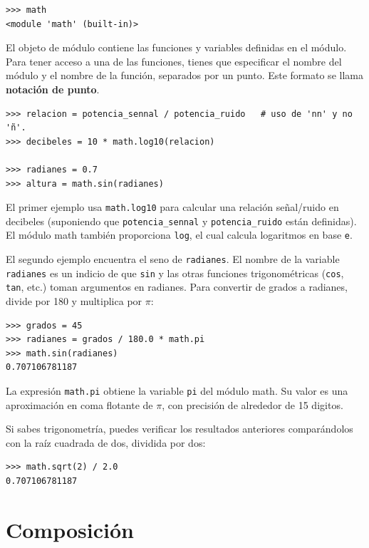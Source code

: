 \documentclass[10pt]{book}
\begin{document}
\begin{verbatim}
>>> math
<module 'math' (built-in)>
\end{verbatim}
%
El objeto de módulo contiene las funciones y variables definidas en el
módulo. Para tener acceso a una de las funciones, tienes que especificar el nombre
del módulo y el nombre de la función, separados por un punto.
Este formato se llama {\bf notación de punto}.

\begin{verbatim}
>>> relacion = potencia_sennal / potencia_ruido   # uso de 'nn' y no 'ñ'.
>>> decibeles = 10 * math.log10(relacion)

>>> radianes = 0.7
>>> altura = math.sin(radianes)
\end{verbatim}
%
El primer ejemplo usa \verb"math.log10" para calcular
una relación señal/ruido en decibeles (suponiendo que \verb"potencia_sennal" y
\verb"potencia_ruido" están definidas).  El módulo math también proporciona {\tt log},
el cual calcula logaritmos en base {\tt e}.

El segundo ejemplo encuentra el seno de {\tt radianes}.  El nombre de la variable {\tt radianes} es un indicio de que {\tt sin} y las otras funciones
trigonométricas ({\tt cos}, {\tt tan}, etc.)  toman argumentos en radianes. Para
convertir de grados a radianes, divide por 180 y multiplica por
$\pi$:

\begin{verbatim}
>>> grados = 45
>>> radianes = grados / 180.0 * math.pi
>>> math.sin(radianes)
0.707106781187
\end{verbatim}
%
La expresión {\tt math.pi} obtiene la variable {\tt pi} del módulo
math.  Su valor es una aproximación en coma flotante
de $\pi$, con precisión de alrededor de 15 digitos.

Si sabes
trigonometría, puedes verificar los resultados anteriores comparándolos con
la raíz cuadrada de dos, dividida por dos:

\begin{verbatim}
>>> math.sqrt(2) / 2.0
0.707106781187
\end{verbatim}
%

\section{Composición}
\end{document}
